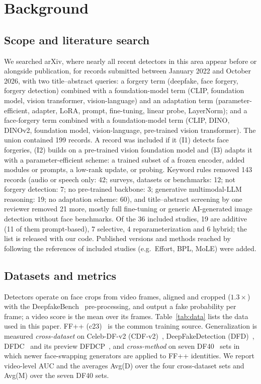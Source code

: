 \documentclass[fonts]{icst}
\begin{document}
\section{Background}
\label{sec:background}

\subsection{Scope and literature search}
\label{sec:search}
We searched arXiv, where nearly all recent detectors in this area appear before or alongside publication, for records submitted between January 2022 and October 2026, with two title--abstract queries: a forgery term (deepfake, face forgery, forgery detection) combined with a foundation-model term (CLIP, foundation model, vision transformer, vision-language) and an adaptation term (parameter-efficient, adapter, LoRA, prompt, fine-tuning, linear probe, LayerNorm); and a face-forgery term combined with a foundation-model term (CLIP, DINO, DINOv2, foundation model, vision-language, pre-trained vision transformer). The union contained 199 records. A record was included if it (I1) detects face forgeries, (I2) builds on a pre-trained vision foundation model and (I3) adapts it with a parameter-efficient scheme: a trained subset of a frozen encoder, added modules or prompts, a low-rank update, or probing. Keyword rules removed 143 records (audio or speech only: 42; surveys, datasets or benchmarks: 12; not forgery detection: 7; no pre-trained backbone: 3; generative multimodal-LLM reasoning: 19; no adaptation scheme: 60), and title--abstract screening by one reviewer removed 21 more, mostly full fine-tuning or generic AI-generated image detection without face benchmarks. Of the 36 included studies, 19 are additive (11 of them prompt-based), 7 selective, 4 reparameterization and 6 hybrid; the list is released with our code. Published versions and methods reached by following the references of included studies (e.g.\ Effort, BPL, MoLE) were added.

\subsection{Datasets and metrics}
Detectors operate on face crops from video frames, aligned and cropped ($1.3\times$) with the DeepfakeBench~\cite{yan2023deepfakebench} pre-processing, and output a fake probability per frame; a video score is the mean over its frames. Table~\ref{tab:data} lists the data used in this paper. FF++ (c23)~\cite{rossler2019ff} is the common training source. Generalization is measured \emph{cross-dataset} on Celeb-DF-v2 (CDF-v2)~\cite{li2020celeb}, DeepFakeDetection (DFD)~\cite{dufour2019dfd}, DFDC~\cite{dolhansky2020dfdc} and its preview DFDCP~\cite{dolhansky2019dfdcp}, and \emph{cross-method} on seven DF40~\cite{yan2024df40} sets in which newer face-swapping generators are applied to FF++ identities. We report video-level AUC and the averages Avg(D) over the four cross-dataset sets and Avg(M) over the seven DF40 sets.
\end{document}
